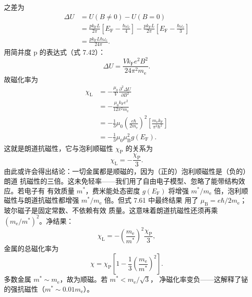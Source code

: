 之差为
\begin{align*}
\Delta U &= U(B\neq0)-U(B=0)\tag{7.54}\\
&= \frac{pk_{\mathrm{F}}L}{2\pi}\left[E_{\mathrm{F}}-\frac{\hbar\omega_{\mathrm{c}}}{4}\right] - \frac{pk_{\mathrm{F}}L}{2\pi}\left[E_{\mathrm{F}}-\frac{\hbar\omega_{\mathrm{c}}}{3}\right]\tag{7.55}\\
&= \frac{pk_{\mathrm{F}}L\hbar\omega_{\mathrm{c}}}{24\pi}.\tag{7.56}
\end{align*}
用简并度 p 的表达式（式 7.42）：
\begin{equation*}
\Delta U = \frac{Vk_{\mathrm{F}}e^{2}B^{2}}{24\pi^{2}m_{\mathrm{e}}}.\tag{7.57}
\end{equation*}
故磁化率为
\begin{align*}
\chi_{\mathrm{L}} &= -\frac{\mu_0}{V}\frac{\partial^{2}\Delta U}{\partial B^{2}}\tag{7.58}\\
&= -\frac{\mu_0k_{\mathrm{F}}e^{2}}{12\pi^{2}m_{\mathrm{e}}}\tag{7.59}\\
&= -\frac{1}{3}\mu_0\left(\frac{e\hbar}{2m_{\mathrm{e}}}\right)^{2}\left[\frac{m_{\mathrm{e}}k_{\mathrm{F}}}{\pi^{2}\hbar^{2}}\right]\tag{7.60}\\
&= -\frac{1}{3}\mu_0\mu_{\mathrm{B}}^{2}g(E_{\mathrm{F}}).\tag{7.61}
\end{align*}
这就是朗道抗磁性，它与泡利顺磁性 $\chi_{\mathrm{P}}$ 的关系为
\begin{equation*}
\chi_{\mathrm{L}} = -\frac{\chi_{\mathrm{P}}}{3}.\tag{7.62}
\end{equation*}
由此或许会得出结论：一切金属都是顺磁的，因为（正的）泡利顺磁性是（负的）朗道
抗磁性的三倍。这未免轻率——我们用了自由电子模型、忽略了能带结构效应。若电子有
有效质量 $m^{*}$，费米能处态密度 $g(E_{\mathrm{F}})$ 将增强 $m^{*}/m_{\mathrm{e}}$
倍，泡利顺磁性与朗道抗磁性都增强 $m^{*}/m_{\mathrm{e}}$ 倍。但式 7.61 中最终结果
用了 $\mu_{\mathrm{B}}=e\hbar/2m_{\mathrm{e}}$；玻尔磁子是固定常数、不依赖有效
质量。这意味着朗道抗磁性还须再乘 $(m_{\mathrm{e}}/m^{*})^{2}$。净结果：
\begin{equation*}
\chi_{\mathrm{L}} = -\left(\frac{m_{\mathrm{e}}}{m^{*}}\right)^{2}\frac{\chi_{\mathrm{P}}}{3},\tag{7.63}
\end{equation*}
金属的总磁化率为
\begin{equation*}
\chi = \chi_{\mathrm{P}}\left[1-\frac{1}{3}\left(\frac{m_{\mathrm{e}}}{m^{*}}\right)^{2}\right].\tag{7.64}
\end{equation*}
多数金属 $m^{*}\sim m_{\mathrm{e}}$，故为顺磁。若 $m^{*}<m_{\mathrm{e}}/\sqrt{3}$，
净磁化率变负——这解释了铋的强抗磁性（$m^{*}\sim0.01m_{\mathrm{e}}$）。

